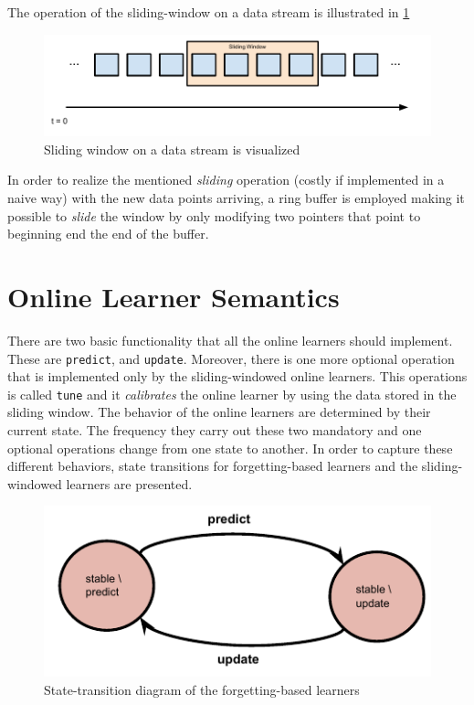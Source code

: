 The operation of the sliding-window on a data stream is illustrated in \ref{fig:streaming}

\begin{figure}[htbp]
  \centering
    \includegraphics[width=\linewidth]{./Figures/streaming.pdf}
  \caption{Sliding window on a data stream is visualized}
  \label{fig:streaming}
\end{figure}

In order to realize the mentioned \textit{sliding} operation (costly if implemented in a naive way) with the new data points arriving, a ring buffer is employed making it possible to \textit{slide} the window by only modifying two pointers that point to beginning end the end of the buffer.

\section{Online Learner Semantics}
\label{section:online_learner_semantics}

There are two basic functionality that all the online learners should implement. These are \texttt{predict}, and \texttt{update}. Moreover, there is one more optional operation that is implemented only by the sliding-windowed online learners. This operations is called \texttt{tune} and it \textit{calibrates} the online learner by using the data stored in the sliding window. The behavior of the online learners are determined by their current state. The frequency they carry out these two mandatory and one optional operations change from one state to another. In order to capture these different behaviors, state transitions for forgetting-based learners and the sliding-windowed learners are presented.

\begin{figure}[htbp]
  \centering
    \includegraphics[width=\linewidth]{./Figures/forgetting-based_states.pdf}
  \caption{State-transition diagram of the forgetting-based learners}
  \label{fig:forgetting-based_states}
\end{figure}

